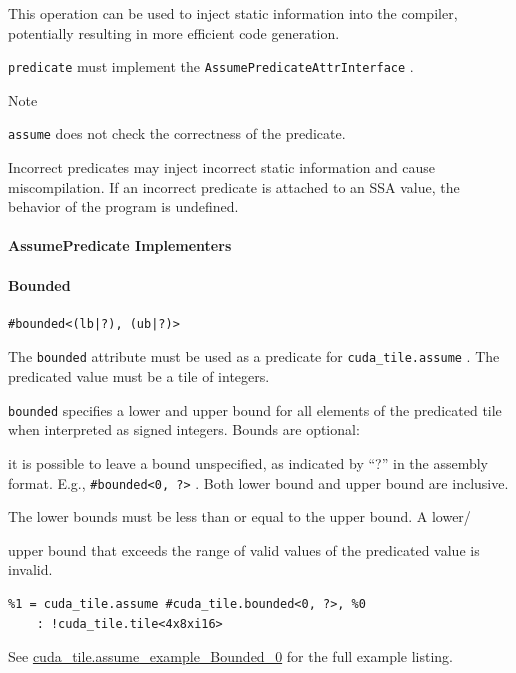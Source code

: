 \documentclass{article}
\begin{document}
This operation can be used to inject static information into the compiler, potentially resulting in more efficient code generation.


\texttt{predicate} must implement the \texttt{AssumePredicateAttrInterface} .


Note


\texttt{assume} does not check the correctness of the predicate.

Incorrect predicates may inject incorrect static information and cause miscompilation. If an incorrect predicate is attached to an SSA value, the behavior of the program is undefined.



\paragraph{AssumePredicate Implementers}


\paragraph{Bounded}

\begin{lstlisting}
#bounded<(lb|?), (ub|?)>
\end{lstlisting}

The \texttt{bounded} attribute must be used as a predicate for \texttt{cuda\_tile.assume} . The predicated value must be a tile of integers.


\texttt{bounded} specifies a lower and upper bound for all elements of the predicated tile when interpreted as signed integers. Bounds are optional:

it is possible to leave a bound unspecified, as indicated by ``?'' in the assembly format. E.g., \texttt{\#bounded<0, ?>} . Both lower bound and upper bound are inclusive.


The lower bounds must be less than or equal to the upper bound. A lower/

upper bound that exceeds the range of valid values of the predicated value is invalid.


\begin{lstlisting}
%1 = cuda_tile.assume #cuda_tile.bounded<0, ?>, %0
    : !cuda_tile.tile<4x8xi16>
\end{lstlisting}

See \href{https://docs.nvidia.com/cuda/tile-ir/latest/sections/appendix.html#example-cuda-tile-assume-example-bounded-0}{cuda\_tile.assume\_example\_Bounded\_0} for the full example listing.
\end{document}
